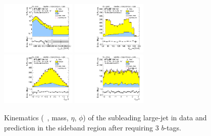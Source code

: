 \begin{figure}[htbp!]
\begin{center}
\includegraphics[width=0.32\textwidth,angle=-90]{figures/boosted/Sideband/b77_ThreeTag_Sideband_sublHCand_Pt_m_1.pdf}
\includegraphics[width=0.32\textwidth,angle=-90]{figures/boosted/Sideband/b77_ThreeTag_Sideband_sublHCand_Mass_s.pdf}\\
\includegraphics[width=0.32\textwidth,angle=-90]{figures/boosted/Sideband/b77_ThreeTag_Sideband_sublHCand_Eta.pdf}
\includegraphics[width=0.32\textwidth,angle=-90]{figures/boosted/Sideband/b77_ThreeTag_Sideband_sublHCand_Phi.pdf}
  \caption{Kinematics (\pt~, mass, $\eta$, $\phi$) of the subleading large-\R jet in data and prediction in the sideband region after requiring 3 $b$-tags.}
  \label{fig:boosted-3b-sideband-ak10-subl}
\end{center}
\end{figure}

